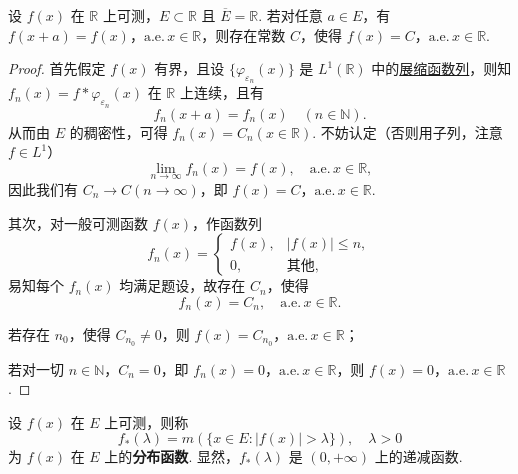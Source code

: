 \documentclass[../../main.tex]{subfiles}
\begin{document}
\begin{example}
设 \( f(x) \) 在 \( \mathbb{R} \) 上可测，\( E \subset \mathbb{R} \) 且 \( \overline{E} = \mathbb{R} \). 若对任意 \( a \in E \)，有 \( f(x + a) = f(x) \)，\(\text{a.e.}\, x \in \mathbb{R} \)，则存在常数 \( C \)，使得 \( f(x) = C \)，\(\text{a.e.}\, x \in \mathbb{R} \).
\end{example}
\begin{proof}
首先假定 \( f(x) \) 有界，且设 \( \{ \varphi_{\varepsilon_n}(x) \} \) 是 \( L^1(\mathbb{R}) \) 中的\hyperref[definition:展缩函数]{展缩函数列}，则知 \( f_n(x) = f * \varphi_{\varepsilon_n}(x) \) 在 \( \mathbb{R} \) 上连续，且有
\[
f_n(x + a) = f_n(x) \quad (n \in \mathbb{N}).
\]
从而由 \( E \) 的稠密性，可得 \( f_n(x) = C_n (x \in \mathbb{R}) \). 不妨认定（否则用子列，注意 \( f \in L^1 \)）
\[
\lim_{n \to \infty} f_n(x) = f(x), \quad \text{a.e.}\, x \in \mathbb{R},
\]
因此我们有 \( C_n \to C (n \to \infty) \)，即 \( f(x) = C \)，\(\text{a.e.}\, x \in \mathbb{R} \).

其次，对一般可测函数 \( f(x) \)，作函数列
\[
f_n(x) = 
\begin{cases} 
f(x), & |f(x)| \leqslant  n, \\
0, & \text{其他},
\end{cases}
\]
易知每个 \( f_n(x) \) 均满足题设，故存在 \( C_n \)，使得
\[
f_n(x) = C_n, \quad \text{a.e.}\, x \in \mathbb{R}.
\]

若存在 \( n_0 \)，使得 \( C_{n_0} \neq 0 \)，则 \( f(x) = C_{n_0} \)，\(\text{a.e.}\, x \in \mathbb{R} \)；

若对一切 \( n \in \mathbb{N} \)，\( C_n = 0 \)，即 \( f_n(x) = 0 \)，\(\text{a.e.}\, x \in \mathbb{R} \)，则 \( f(x) = 0 \)，\(\text{a.e.}\, x \in \mathbb{R} \).

\end{proof}

\begin{definition}[分布函数]
设 \( f(x) \) 在 \( E \) 上可测，则称
\[
f_*(\lambda) = m(\{ x \in E : |f(x)| > \lambda \}), \quad \lambda > 0
\]
为 \( f(x) \) 在 \( E \) 上的\textbf{分布函数}. 显然，\( f_*(\lambda) \) 是 \( (0, +\infty) \) 上的递减函数.
\end{definition}
\end{document}
